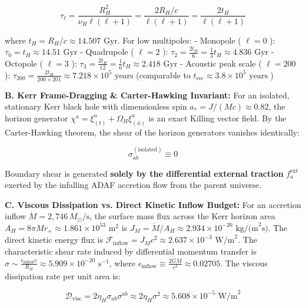 \documentclass[11pt,a4paper]{article}
\theoremstyle{definition}\newtheorem{definition}{Definition}
\theoremstyle{remark}\newtheorem{remark}{Remark}
\begin{document}
\begin{equation}
\tau_\ell = \frac{R_H^2}{\nu_H \ell(\ell + 1)} = \frac{2 R_H / c}{\ell(\ell + 1)} = \frac{2 t_H}{\ell(\ell + 1)}
\end{equation}


where $t_H = R_H / c \approx 14.507\text{ Gyr}$. For low multipoles:
- Monopole ( $\ell = 0$ ): $\tau_0 = t_H \approx 14.51\text{ Gyr}$
- Quadrupole ( $\ell = 2$ ): $\tau_2 = \frac{2 t_H}{6} = \frac{1}{3} t_H \approx 4.836\text{ Gyr}$
- Octopole ( $\ell = 3$ ): $\tau_3 = \frac{2 t_H}{12} = \frac{1}{6} t_H \approx 2.418\text{ Gyr}$
- Acoustic peak scale ( $\ell = 200$ ): $\tau_{200} = \frac{2 t_H}{200 \times 201} \approx 7.218 \times 10^5\text{ years}$ (comparable to $t_{\text{rec}} \approx 3.8 \times 10^5\text{ years}$ )

\textbf{B. Kerr Frame-Dragging \& Carter-Hawking Invariant:}
For an isolated, stationary Kerr black hole with dimensionless spin $a_* = J/(M c) \approx 0.82$, the horizon generator $\chi^a = \xi_{(t)}^a + \Omega_H \xi_{(\phi)}^a$ is an exact Killing vector field. By the Carter-Hawking theorem, the shear of the horizon generators vanishes identically:


\begin{equation}
\sigma_{ab}^{(\text{isolated})} \equiv 0
\end{equation}


Boundary shear is generated \textbf{solely by the differential external traction} $f_a^{\text{ext}}$ exerted by the infalling ADAF accretion flow from the parent universe.

\textbf{C. Viscous Dissipation vs. Direct Kinetic Inflow Budget:}
For an accretion inflow $\dot{M} = 2{,}746\,M_\odot/\text{s}$, the surface mass flux across the Kerr horizon area $A_H = 8\pi M r_+ \approx 1.861 \times 10^{53}\text{ m}^2$ is $J_M = \dot{M}/A_H \approx 2.934 \times 10^{-20}\text{ kg/(m}^2\text{s)}$. The direct kinetic energy flux is $\mathcal{F}_{\text{inflow}} = J_M c^2 \approx 2.637 \times 10^{-3}\text{ W/m}^2$.
The characteristic shear rate induced by differential momentum transfer is $\sigma \sim \frac{\epsilon_{\text{inflow}} c}{R_H} \approx 5.909 \times 10^{-20}\text{ s}^{-1}$, where $\epsilon_{\text{inflow}} \equiv \frac{2 G \dot{M}}{c^3} \approx 0.02705$.
The viscous dissipation rate per unit area is:


\begin{equation}
\mathcal{D}_{\text{visc}} = 2\eta_H \sigma_{ab}\sigma^{ab} \approx 2 \eta_H \sigma^2 \approx 5.608 \times 10^{-5}\text{ W/m}^2
\end{equation}
\end{document}
